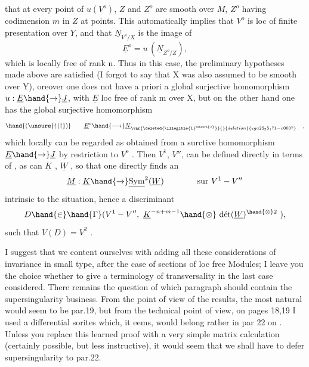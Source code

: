 
that at every point of $u(V^{o})$, $Z$ and $Z^{o}$ are smooth over $M$, $Z^{o}$ having codimension
$m$ in $Z$ at  points. This automatically implies that $V^{o}$ is
loc of finite presentation over $Y$, and that $\underline{N}_{V^{o}/X}$ is the image of
\[ \underline{E}^{o} = u\,(\underline{N}_{Z^{o}/Z}) , \]
which is locally free of rank n. Thus in this case, the preliminary hypotheses
made above are satisfied (I forgot to say that X was also assumed to be
smooth over Y), oreover one does not have a priori a global surjective
homomorphism $u:\underline{E}\hand{\rightarrow}\underline{J}$, with $\underline{E}$ loc free of rank m over X, but on the other hand
one has the global surjective homomorphism
\[ \hand{(\unsure{\nmid|\dagger})} \qquad \underline{E}^{o}\hand{\longrightarrow} \underline{N}_{\var{\deleted{\illegible{1}^{\unsure{o}}}}{}{deletion}{ega25_25_171-v0007}} \quad , \]
which locally can be regarded as obtained from a surctive homomorphism
$\underline{E}\hand{\rightarrow}\underline{J}$ by restriction to $V^{o}$ . Then $V^{1}$, $V''$, can be defined directly
in terms of \hand{(\unsure{\nmid|\dagger})} , as can $\underline{K}$ , $\underline{W}$ , so that one directly finds an
\[ \underline{M} : \underline{K}\hand{\rightarrow} \underline{\mathrm{Sym}}^{2}(\underline{W}) \qquad\qquad \text{sur } V^{1}-V'' \]
intrinsic to the situation, hence  a discriminant
\[ D \hand{\in} \hand{\Gamma}(V^{1}-V'',\ \underline{K}^{-n+m-1}\hand{\otimes}\ \text{dét}(\underline{W})^{\hand{\otimes}2}\ ), \]
such that $V(D) = V^{2}$ .

I suggest that we content ourselves with adding all these considerations of
invariance in small type, after the case of sections of loc free Modules;
I leave you the choice whether to give a terminology of transversality in
the last case considered. There remains the question of which paragraph should
contain the supersingularity business. From the point of view of the results, the most natural
would seem to be par.19, but from the technical point of view, on pages 18,19
I used a differential sorites which, it eems, would belong rather in par
22 on . Unless you replace this learned proof with a
very simple matrix calculation (certainly possible, but less instructive), it
would seem that we shall have to defer supersingularity to par.22.

